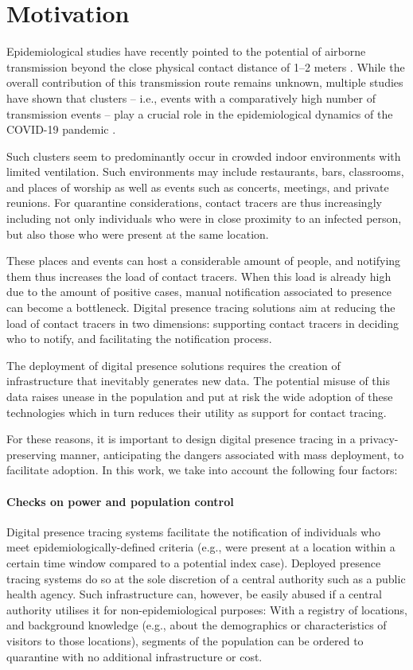 \section{Motivation}

Epidemiological studies have recently pointed to the potential of airborne
transmission beyond the close physical contact distance of 1--2 meters
\cite{prather2020airborne}. While the overall contribution of this transmission
route remains unknown, multiple studies have shown that clusters -- i.e., events
with a comparatively high number of transmission events -- play a crucial role
in the epidemiological dynamics of the COVID-19 pandemic
\cite{adam2020clustering, wong2020evidence}.

Such clusters seem to predominantly occur in crowded indoor environments with limited ventilation. Such environments may include restaurants, bars, classrooms, and places of worship as well as events such as concerts, meetings, and private reunions. For quarantine considerations, contact tracers are thus increasingly including not only individuals who were in close proximity to an infected person, but also those who were present at the same location. 

These places and events can host a considerable amount of people, and notifying
them thus increases the load of contact tracers. When this load is already high due to the amount of positive cases, manual notification associated to presence can become a bottleneck. Digital presence tracing solutions aim at reducing the load of contact tracers in two dimensions: supporting contact tracers in deciding who to notify, and facilitating the notification process. 

The deployment of digital presence solutions requires the creation of infrastructure that inevitably generates new data. The potential misuse of this data raises unease in the population and put at risk the wide adoption of these technologies which in turn reduces their utility as support for contact tracing.

For these reasons, it is important to design digital presence tracing in a privacy-preserving manner, anticipating the dangers associated with mass deployment, to facilitate adoption. In this work, we take into account the following four factors:

\paragraph{Checks on power and population control}
Digital presence tracing systems facilitate the notification of individuals who meet epidemiologically-defined criteria (e.g., were present at a location within a certain time window compared to a potential index case). Deployed presence tracing systems do so at the sole discretion of a central authority such as a public health agency. Such infrastructure can, however, be easily abused if a central authority utilises it for non-epidemiological purposes: With a registry of locations, and background knowledge (e.g., about the demographics or characteristics of visitors to those locations), segments of the population can be ordered to quarantine with no additional infrastructure or cost.

